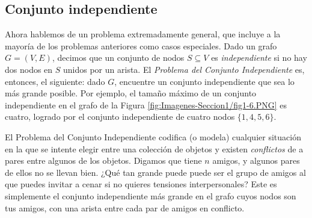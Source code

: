 \documentclass[a4paper, 12pt]{book}
\begin{document}
\subsection*{Conjunto independiente}

Ahora hablemos de un problema extremadamente general, que incluye a la mayoría de los problemas anteriores como casos especiales. Dado un grafo $G=(V,E)$, decimos que un conjunto de nodos $S \subseteq V$ es \textit{independiente} si no hay dos nodos en $S$ unidos por un arista. El \textit{Problema del Conjunto Independiente} es, entonces, el siguiente: dado $G$, encuentre un conjunto independiente que sea lo más grande posible. Por ejemplo, el tamaño máximo de un conjunto independiente en el grafo de la Figura \ref{fig:Imagenes-Seccion1/fig1-6.PNG} es cuatro, logrado por el conjunto independiente de cuatro nodos $\{1,4,5,6\}$.


El Problema del Conjunto Independiente codifica (o modela) cualquier situación en la que se intente elegir entre una colección de objetos y existen \textit{conflictos} de a pares entre algunos de los objetos. Digamos que tiene $n$ amigos, y algunos pares de ellos no se llevan bien. ¿Qué tan grande puede puede ser el grupo de amigos al que puedes invitar a cenar si no quieres tensiones interpersonales? Este es simplemente el conjunto independiente más grande en el grafo cuyos nodos son tus amigos, con una arista entre cada par de amigos en conflicto.
\end{document}
